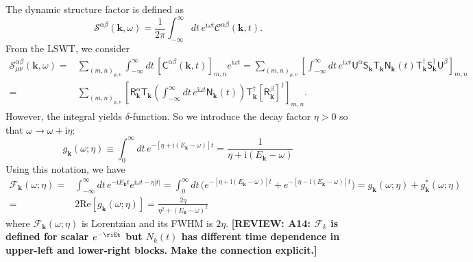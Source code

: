 \documentclass[aps, prx, nofootinbib, superscriptaddress]{revtex4-2}
\newcommand{\REVIEW}[1]{{\color{reviewcolor}\bfseries [REVIEW: #1]}}
\newcommand{\kvec}{\mathbf{k}}
\newcommand{\ri}{\mathrm{i}}
\begin{document}
The dynamic structure factor is defined as 
\begin{equation}
    \mathcal{S}^{\alpha\beta}(\kvec, \omega) 
    = \frac{1}{2\pi} \int_{-\infty}^{\infty} d t \, e^{\ri \omega t} \mathcal{C}^{\alpha\beta} (\kvec, t).
\end{equation}
From the LSWT, we consider 
\begin{align*}
    \mathcal{S}^{\alpha\beta}_{\mu\nu} (\kvec, \omega) 
    = & \sum_{(m,n)_{\mu,\nu}} \int_{-\infty}^{\infty} dt \, [\mathsf{C}^{\alpha\beta} (\kvec, t)]_{m,n} e^{\ri \omega t}
    = \sum_{(m,n)_{\mu,\nu}} 
    \left[ 
    \int_{-\infty}^{\infty} dt \, e^{\ri \omega t} 
    \mathsf{U}^{\alpha} 
    \mathsf{S}_{\kvec}^{\phantom \dagger} 
    \mathsf{T}_{\kvec}^{\phantom \dagger} 
    \mathsf{N}_{\kvec}^{\phantom \dagger}  (t)
    \mathsf{T}_{\kvec}^{         \dagger}
    \mathsf{S}_{\kvec}^{         \dagger}
    \mathsf{U}^{\beta}
    \right]_{m,n}  \\
    = & \sum_{(m,n)_{\mu,\nu}} 
    \left[  \mathsf{R}^{\alpha}_{\kvec} \mathsf{T}_{\kvec}
    \left( \int_{-\infty}^{\infty} dt \, e^{\ri \omega t} \mathsf{N}_{\kvec} (t) \right)
    \mathsf{T}_{\kvec}^{\dagger} [\mathsf{R}^{\beta}_{\kvec}]^{\dagger} \right]_{m,n}.
\end{align*}
However, the integral yields $\delta$-function. So we introduce the decay factor $\eta > 0$ so that $\omega \rightarrow \omega + \ri \eta$:
\begin{equation}
    g_{\kvec} ( \omega ; \eta ) 
    \equiv \int_{0}^{\infty} dt \, e^{ - [ \eta  + \ri( E_{\kvec} - \omega ) ] t}
    = \frac{1}{\eta + \ri ( E_{\kvec} - \omega )}
\end{equation}
Using this notation, we have
\begin{align}
    \mathcal{F}_{\kvec} (\omega; \eta) = & \int_{-\infty}^{\infty} dt\, e^{-\ri E_{\kvec} t} e^{ \ri\omega t - \eta |t|} 
    =  \int_{0}^{\infty} dt \, 
    \big( e^{ - [ \eta  + \ri( E_{\kvec} - \omega ) ] t} + e^{ - [ \eta  - \ri( E_{\kvec} - \omega ) ] t} \big) 
    =  g_{\kvec} ( \omega ; \eta ) + g_{\kvec}^{*} ( \omega ; \eta ) \\
    = & 2 \mathrm{Re} [ g_{\kvec} ( \omega ; \eta ) ]
    = \frac{2\eta}{\eta^{2} + ( E_{\kvec} - \omega )^{2}}
\end{align}
where $\mathcal{F}_{\kvec}(\omega; \eta)$ is Lorentzian and its FWHM is $2\eta$.
\REVIEW{A14: $\mathcal{F}_k$ is defined for scalar $e^{-\riEt}$ but $N_k(t)$ has different time dependence in upper-left and lower-right blocks. Make the connection explicit.}
\end{document}
